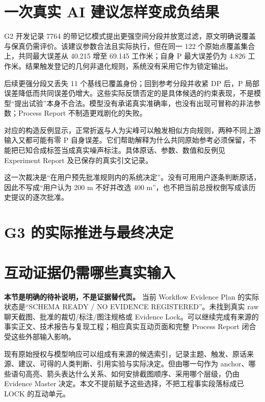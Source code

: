 \documentclass[11pt,a4paper]{article}
\begin{document}
\section{一次真实 AI 建议怎样变成负结果}
G2 开发记录 7764 的带记忆模式提出更强空间分段并放宽过滤，原文明确说覆盖与保真仍需评价。该建议参数合法且实际执行，但在同一 122 个原始点覆盖集合上，共同最大误差从 40.215 增至 69.145 工作米；自身 P 最大误差仍为 4.826 工作米。结果触发登记的几何非退化规则，系统没有采用它作为锁定输出。

后续更强分段又丢失 11 个基线已覆盖身份；回到参考分段并收紧 DP 后，P 局部误差降低而共同误差仍增大。这些实际反馈否定的是具体候选的约束表现，不是模型“提出试验”本身不合法。模型没有承诺真实准确率，也没有出现可冒称的非法参数；Process Report 不制造更戏剧化的失败。

对应的构造反例显示，正常折返与人为尖峰可以触发相似方向规则，两种不同上游输入又都可能有零 P 自身误差。它们帮助解释为什么共同原始参考必须保留，不能把已知合成标签当成真实噪声标注。具体原话、参数、数值和反例见 Experiment Report 及已保存的真实引文记录。

这一次裁决是“在用户预先批准规则内的系统决定”。没有可用用户逐条判断原话，因此不写成“用户认为 200 m 不好并改选 400 m”，也不把当前总授权倒写成该历史提议的逐次批准。

\section{G3 的实际推进与最终决定}


\section{互动证据仍需哪些真实输入}
\begin{contextbox}
\textbf{本节是明确的待补说明，不是证据替代页。} 当前 Workflow Evidence Plan 的实际状态是“SCHEMA READY / NO EVIDENCE REGISTERED”。未找到真实 raw 聊天截图、批准的裁切/标注/图注规格或 Evidence Lock。可以继续完成有来源的事实正文、技术报告与复现工程；相应真实互动页面和完整 Process Report 闭合受这些外部输入影响。
\end{contextbox}

现有原始授权与模型响应可以组成有来源的候选索引，记录主题、触发、原话来源、建议、可得的人类判断、引用实验与实际决定。但由哪一句作为 anchor、哪些语句高亮、箭头表达什么关系、如何安排截图顺序、采用哪个层级，仍由 Evidence Master 决定。本文不提前赋予这些选择，不把工程事实段落标成已 LOCK 的互动单元。
\end{document}
